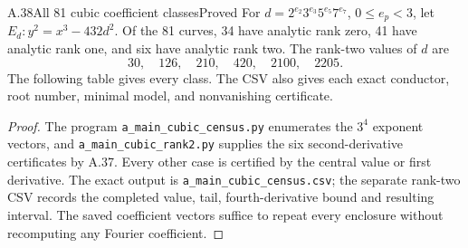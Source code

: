 \begin{statement}{A.38}{All 81 cubic coefficient classes}{Proved}
For $d=2^{e_2}3^{e_3}5^{e_5}7^{e_7}$, $0\leq e_p<3$, let
$E_d:y^2=x^3-432d^2$. Of the 81 curves, 34 have analytic rank zero,
41 have analytic rank one, and six have analytic rank two. The rank-two
values of $d$ are
\[
 30,\quad126,\quad210,\quad420,\quad2100,\quad2205.
\]
The following table gives every class. The CSV also gives each exact
conductor, root number, minimal model, and nonvanishing certificate.
\end{statement}
\begin{proof}
The program \texttt{a\_main\_cubic\_census.py} enumerates the $3^4$
exponent vectors, and \texttt{a\_main\_cubic\_rank2.py} supplies the six
second-derivative certificates by A.37. Every other case is certified by
the central value or first derivative. The exact output is
\texttt{a\_main\_cubic\_census.csv}; the separate rank-two CSV records
the completed value, tail, fourth-derivative bound and resulting interval.
The saved coefficient vectors suffice to repeat every enclosure without
recomputing any Fourier coefficient.
\end{proof}


